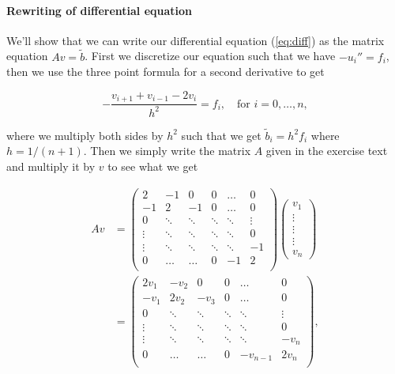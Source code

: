 \documentclass[english, 11pt]{article}
\begin{document}
\paragraph{Rewriting of differential equation}
We'll show that we can write our differential equation (\ref{eq:diff}) as the matrix equation $ Av = \tilde b$. First we discretize our equation such that we have $-u_i'' = f_i$, then we use the three point formula for a second derivative to get

$$ -\frac{v_{i+1} + v_{i-1} - 2v_i}{h^2} = f_i, \quad \text{for } i=0,\ldots,n, $$

where we multiply both sides by $h^2$ such that we get $ \tilde b_i = h^2 f_i$ where $h = 1/(n+1) $. Then we simply write the matrix $A$ given in the exercise text and multiply it by $v$ to see what we get

\begin{align*}
	Av &=
	\left(\begin{matrix}
		2 & -1 & 0 & 0 &\ldots & 0 \\	
		-1 & 2 & -1 & 0 & \ldots & 0 \\
		0 & \ddots & \ddots & \ddots & \ddots & \vdots \\
		\vdots & \ddots & \ddots & \ddots & \ddots & 0 \\
		\vdots & \ddots & \ddots & \ddots & \ddots & -1 \\
		0 & \ldots & \ldots & 0 & -1 & 2 \\
	\end{matrix}\right)\left(
	\begin{matrix}
		v_1 \\ \vdots\\ \vdots \\ \vdots \\ v_n 
	\end{matrix} \right) \\
	&= \left(\begin{matrix}
		2v_1 & -v_2 & 0 & 0 &\ldots & 0 \\	
		-v_1 & 2v_2 & -v_3 & 0 & \ldots & 0 \\
		0 & \ddots & \ddots & \ddots & \ddots & \vdots \\
		\vdots & \ddots & \ddots & \ddots & \ddots & 0 \\
		\vdots & \ddots & \ddots & \ddots & \ddots & -v_n \\
		0 & \ldots & \ldots & 0 & -v_{n-1} & 2v_n \\
	\end{matrix}\right),
\end{align*}
\end{document}
